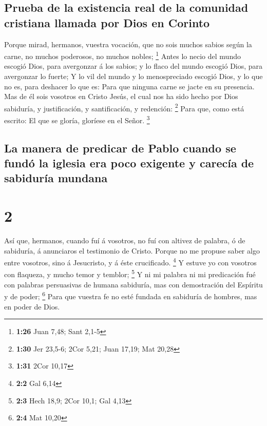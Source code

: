 \hypertarget{prueba-de-la-existencia-real-de-la-comunidad-cristiana-llamada-por-dios-en-corinto}{%
\subsection{Prueba de la existencia real de la comunidad cristiana
llamada por Dios en
Corinto}\label{prueba-de-la-existencia-real-de-la-comunidad-cristiana-llamada-por-dios-en-corinto}}

 Porque mirad, hermanos, vuestra vocación, que no sois
muchos sabios según la carne, no muchos poderosos, no muchos nobles;
\footnote{\textbf{1:26} Juan 7,48; Sant 2,1-5}  Antes lo
necio del mundo escogió Dios, para avergonzar á los sabios; y lo flaco
del mundo escogió Dios, para avergonzar lo fuerte;  Y lo
vil del mundo y lo menospreciado escogió Dios, y lo que no es, para
deshacer lo que es:  Para que ninguna carne se jacte en su
presencia.  Mas de él sois vosotros en Cristo Jesús, el
cual nos ha sido hecho por Dios sabiduría, y justificación, y
santificación, y redención: \footnote{\textbf{1:30} Jer 23,5-6; 2Cor
  5,21; Juan 17,19; Mat 20,28}  Para que, como está
escrito: El que se gloría, gloríese en el Señor. \footnote{\textbf{1:31}
  2Cor 10,17}

\hypertarget{la-manera-de-predicar-de-pablo-cuando-se-funduxf3-la-iglesia-era-poco-exigente-y-carecuxeda-de-sabiduruxeda-mundana}{%
\subsection{La manera de predicar de Pablo cuando se fundó la iglesia
era poco exigente y carecía de sabiduría
mundana}\label{la-manera-de-predicar-de-pablo-cuando-se-funduxf3-la-iglesia-era-poco-exigente-y-carecuxeda-de-sabiduruxeda-mundana}}

\hypertarget{section-1}{%
\section{2}\label{section-1}}

 Así que, hermanos, cuando fuí á vosotros, no fuí con
altivez de palabra, ó de sabiduría, á anunciaros el testimonio de
Cristo.  Porque no me propuse saber algo entre vosotros,
sino á Jesucristo, y á éste crucificado. \footnote{\textbf{2:2} Gal 6,14}
 Y estuve yo con vosotros con flaqueza, y mucho temor y
temblor; \footnote{\textbf{2:3} Hech 18,9; 2Cor 10,1; Gal 4,13}
 Y ni mi palabra ni mi predicación fué con palabras
persuasivas de humana sabiduría, mas con demostración del Espíritu y de
poder; \footnote{\textbf{2:4} Mat 10,20}  Para que vuestra
fe no esté fundada en sabiduría de hombres, mas en poder de Dios.

